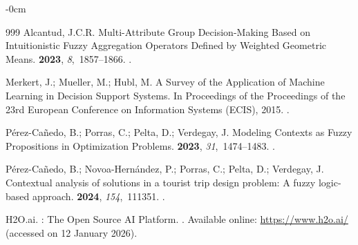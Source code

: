 \documentclass[mathematics,article,submit,moreauthors]{Definitions/mdpi}
\begin{document}
\begin{adjustwidth}{-\extralength}{0cm}
\begin{thebibliography}{999}
Alcantud, J.C.R.
\newblock Multi-Attribute Group Decision-Making Based on Intuitionistic Fuzzy Aggregation Operators Defined by Weighted Geometric Means.
 {\bf 2023}, {\em 8},~1857--1866.
.

Merkert, J.; Mueller, M.; Hubl, M.
\newblock A Survey of the Application of Machine Learning in Decision Support Systems.
\newblock In Proceedings of the Proceedings of the 23rd European Conference on Information Systems (ECIS),  2015.
.

Pérez-Cañedo, B.; Porras, C.; Pelta, D.; Verdegay, J.
\newblock Modeling Contexts as Fuzzy Propositions in Optimization Problems.
 {\bf 2023}, {\em 31},~1474--1483.
.

P{\'e}rez-Ca{\~n}edo, B.; Novoa-Hern{\'a}ndez, P.; Porras, C.; Pelta, D.; Verdegay, J.
\newblock Contextual analysis of solutions in a tourist trip design problem: A fuzzy logic-based approach.
 {\bf 2024}, {\em 154},~111351.
.

{H2O.ai}.
: The Open Source {AI} Platform.
.
\newblock Available online: {\url{https://www.h2o.ai/}} (accessed on 12 January 2026).

\end{thebibliography}
\end{adjustwidth}
\PublishersNote{}
\end{document}
